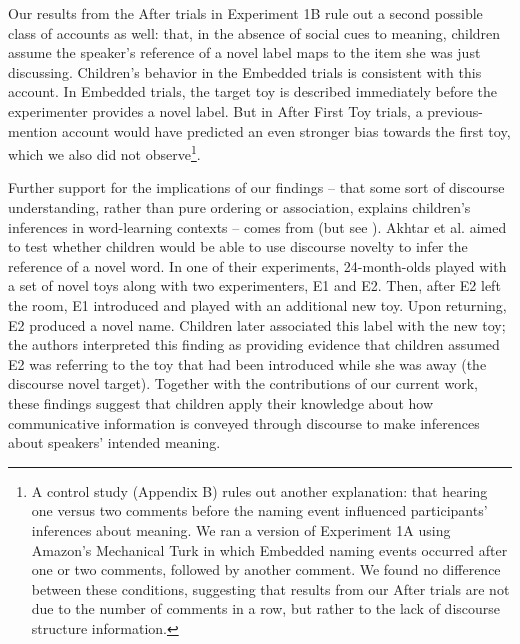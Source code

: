 \documentclass[man]{apa2}
\begin{document}
Our results from the After trials in Experiment 1B rule out a second possible class of accounts as well: that, in the absence of social cues to meaning, children assume the speaker's reference of a novel label maps to the item she was just discussing. Children's behavior in the Embedded trials is consistent with this account. In Embedded trials, the target toy is described immediately before the experimenter provides a novel label. But in After First Toy trials, a previous-mention account would have predicted an even stronger bias towards the first toy, which we also did not observe\footnote {A control study (Appendix B) rules out another explanation: that hearing one versus two comments before the naming event influenced participants' inferences about meaning.  We ran a version of Experiment 1A using Amazon's Mechanical Turk in which Embedded naming events occurred after one or two comments, followed by another comment.  We found no difference between these conditions, suggesting that results from our After trials are not due to the number of comments in a row, but rather to the lack of discourse structure information.}. 

Further support for the implications of our findings -- that some sort of discourse understanding, rather than pure ordering or association, explains children's inferences in word-learning contexts -- comes from  (but see ). Akhtar et al. aimed to test whether children would be able to use discourse novelty to infer the reference of a novel word. In one of their experiments, 24-month-olds played with a set of novel toys along with two experimenters, E1 and E2. Then, after E2 left the room, E1 introduced and played with an additional new toy. Upon returning, E2 produced a novel name. Children later associated this label with the new toy; the authors interpreted this finding as providing evidence that children assumed E2 was referring to the toy that had been introduced while she was away (the discourse novel target). Together with the contributions of our current work, these findings suggest that children apply their knowledge about how communicative information is conveyed through discourse to make inferences about speakers' intended meaning.  

\end{document}
